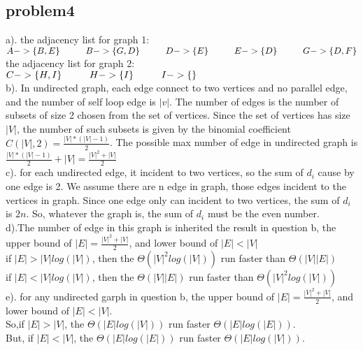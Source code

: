 \documentclass[11pt]{article}
\newcommand\tab[1][1cm]{\hspace*{#1}}
\begin{document}
\subsection{problem4}
a).
the adjacency list for graph 1:\\
 $A->\{B,E\} \tab B->\{G,D\} \tab D->\{E\} \tab E->\{D\} \tab G->\{D,F\} $\\
the adjacency list for graph 2:\\
$C->\{H,I\} \tab H->\{I\} \tab I->\{\}$ \\
b). In undirected graph,  each edge connect to two vertices and no parallel edge, and the number of self loop edge is $|v|$. The number of edges is the number of subsets of size 2 chosen from the set of vertices. Since the set of vertices has size $|V|$, the number of such subsets is given by the binomial coefficient $C(|V|,2)=\frac{|V|*(|V|-1)}{2}$. The possible max number of edge in undirected graph is $\frac{|V|*(|V|-1)}{2}+|V|=\frac{|V|^2+|V|}{2}$ \\
c). for each undirected edge, it incident to two vertices, so the sum of $d_i$ cause by one edge is 2. We assume there are n edge in graph, those edges incident to the vertices in graph. Since one edge only can incident to two vertices, the sum of $d_i$ is $2n$. So, whatever the graph is, the sum of $d_i$ must be the even number.\\
d).The number of edge in this graph is inherited the result in question b,  the upper bound of  $|E|=\frac{|V|^2+|V|}{2}$, and lower bound of $|E|<|V|$\\
if $|E|>|V|log(|V|)$, then the $\Theta (|V|^2log(|V|))$ run faster than $\Theta(|V||E|)$ \\
if $|E|<|V|log(|V|)$, then the  $\Theta(|V||E|)$ run faster than $\Theta (|V|^2log(|V|))$ \\
e). for any undirected garph in question b, the upper bound of  $|E|=\frac{|V|^2+|V|}{2}$, and lower bound of $|E|<|V|$. \\ So,if $|E|>|V|$, the $\Theta(|E|log(|V|))$ run faster $\Theta(|E|log(|E|))$. \\But, if $|E|<|V|$, the $\Theta(|E|log(|E|))$ run faster $\Theta(|E|log(|V|))$.
\end{document}
